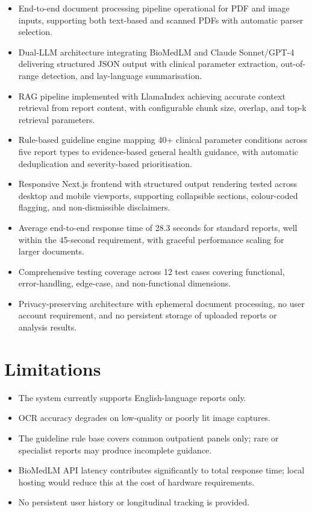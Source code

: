 \begin{itemize}
    \item End-to-end document processing pipeline operational for PDF and image inputs, supporting both text-based and scanned PDFs with automatic parser selection.
    \item Dual-LLM architecture integrating BioMedLM and Claude Sonnet/GPT-4 delivering structured JSON output with clinical parameter extraction, out-of-range detection, and lay-language summarisation.
    \item RAG pipeline implemented with LlamaIndex achieving accurate context retrieval from report content, with configurable chunk size, overlap, and top-k retrieval parameters.
    \item Rule-based guideline engine mapping 40+ clinical parameter conditions across five report types to evidence-based general health guidance, with automatic deduplication and severity-based prioritisation.
    \item Responsive Next.js frontend with structured output rendering tested across desktop and mobile viewports, supporting collapsible sections, colour-coded flagging, and non-dismissible disclaimers.
    \item Average end-to-end response time of 28.3 seconds for standard reports, well within the 45-second requirement, with graceful performance scaling for larger documents.
    \item Comprehensive testing coverage across 12 test cases covering functional, error-handling, edge-case, and non-functional dimensions.
    \item Privacy-preserving architecture with ephemeral document processing, no user account requirement, and no persistent storage of uploaded reports or analysis results.
\end{itemize}

\section{Limitations}
\begin{itemize}
    \item The system currently supports English-language reports only.
    \item OCR accuracy degrades on low-quality or poorly lit image captures.
    \item The guideline rule base covers common outpatient panels only; rare or specialist reports may produce incomplete guidance.
    \item BioMedLM API latency contributes significantly to total response time; local hosting would reduce this at the cost of hardware requirements.
    \item No persistent user history or longitudinal tracking is provided.
\end{itemize}

